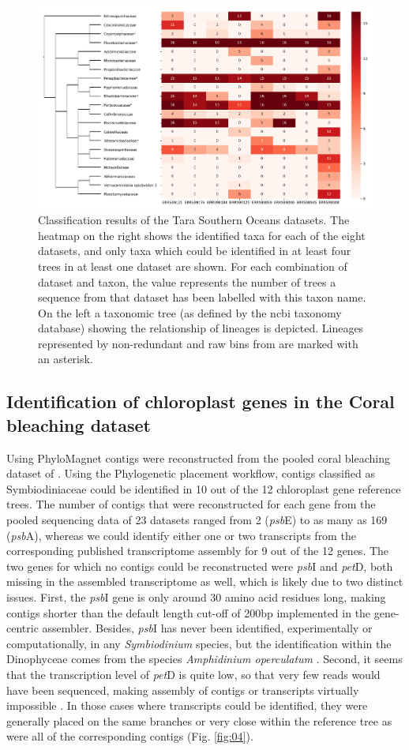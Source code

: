\documentclass{bioinfo}
\begin{document}
\begin{figure}[!tpb]%
\centerline{\includegraphics[width=.45\textwidth]{Fig3.pdf}}
\caption{Classification results of the Tara Southern Oceans datasets. The heatmap on the right shows the identified taxa for each of the eight datasets, and only taxa which could be identified in at least four trees in at least one dataset are shown. For each combination of dataset and taxon, the value represents the number of trees a sequence from that dataset has been labelled with this taxon name. On the left a taxonomic tree (as defined by the ncbi taxonomy database) showing the relationship of lineages is depicted. Lineages represented by non-redundant and raw bins from \citet{Delmont2018} are marked with an asterisk.}\label{fig:03}
\end{figure}

\subsection{Identification of chloroplast genes in the Coral bleaching dataset}
Using PhyloMagnet contigs were reconstructed from the pooled coral bleaching dataset of \citet{Frazier2017}. Using the Phylogenetic placement workflow, contigs classified as Symbiodiniaceae could be identified in 10 out of the 12 chloroplast gene reference trees. The number of contigs that were reconstructed for each gene from the pooled sequencing data of 23 datasets ranged from 2 (\textit{psb}E) to as many as 169 (\textit{psb}A), whereas we could identify either one or two transcripts from the corresponding published transcriptome assembly for 9 out of the 12 genes. The two genes for which no contigs could be reconstructed were \textit{psb}I and \textit{pet}D, both missing in the assembled transcriptome as well, which is likely due to two distinct issues. First, the \textit{psb}I gene is only around 30 amino acid residues long, making contigs shorter than the default length cut-off of 200bp implemented in the gene-centric assembler. Besides, \textit{psb}I has never been identified, experimentally or computationally, in any \textit{Symbiodinium} species, but the identification within the Dinophyceae comes from the species \textit{Amphidinium operculatum} \citep{Nisbet2004,Barbrook2014}. Second, it seems that the transcription level of \textit{pet}D is quite low, so that very few reads would have been sequenced, making assembly of contigs or transcripts virtually impossible \citep{Nisbet2008}. In those cases where transcripts could be identified, they were generally placed on the same branches or very close within the reference tree as were all of the corresponding contigs (Fig. \ref{fig:04}).
\end{document}
